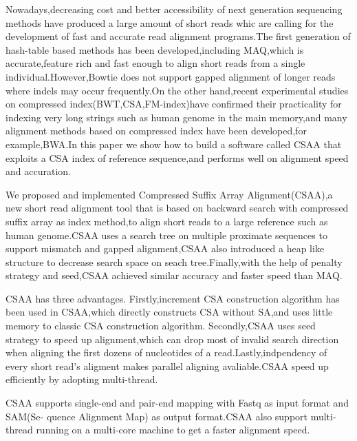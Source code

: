 \begin{englishabstract}

\setlength\parindent{0em}

\vspace{2ex}
Nowadays,decreasing cost and better accessibility of next generation sequencing methods
have produced a large amount of short reads whic are calling for the development of fast
and accurate read alignment programs.The first generation of hash-table based methods has
been developed,including MAQ,which is accurate,feature rich and fast enough to align short
reads from a single individual.However,Bowtie does not support gapped alignment of longer reads
where indels may occur frequently.On the other hand,recent experimental studies on compressed
index(BWT,CSA,FM-index)have confirmed their practicality for indexing very long strings such
as human genome in the main memory,and many alignment methods based on compressed index have
been developed,for example,BWA.In this paper we show how to build a software called CSAA that
exploits a CSA index of reference sequence,and performs well on alignment speed and accuration.

\vspace{2ex}
We proposed and implemented Compressed Suffix Array Alignment(CSAA),a new short read alignment
tool that is based on backward search with compressed suffix array as index method,to align short reads to a
large reference such as human genome.CSAA uses a search tree on multiple proximate sequences to
support mismatch and gapped alignment,CSAA also introduced a heap like structure to decrease
search space on seach tree.Finally,with the help of penalty strategy and seed,CSAA achieved
similar accuracy and faster speed than MAQ.


\vspace{2ex}
CSAA has three advantages. Firstly,increment CSA construction algorithm has been used in
CSAA,which directly constructs CSA without SA,and uses little memory to classic CSA construction algorithm.
Secondly,CSAA uses seed strategy to speed up alignment,which can drop most of invalid
search direction when aligning the first dozens of nucleotides of a read.Lastly,indpendency of
every short read's aligment makes parallel aligning avaliable.CSAA speed up efficiently by
adopting multi-thread.

\vspace{2ex}
CSAA supports single-end and pair-end mapping with Fastq as input format and SAM(Se- quence Alignment Map)
as output format.CSAA also support multi-thread running on a multi-core machine to get a faster
alignment speed.




\end{englishabstract}

